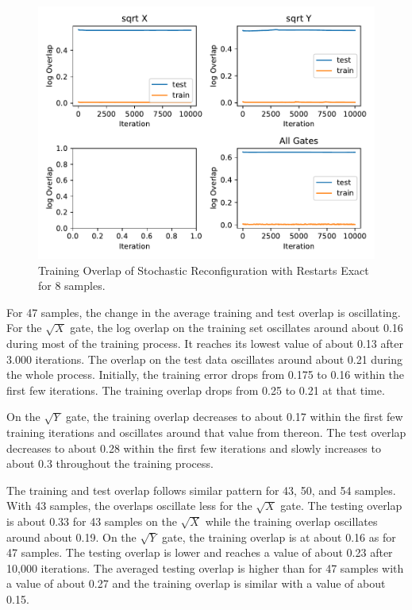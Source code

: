 \begin{figure}[H]
  \centering
  \includegraphics[width=\textwidth]{figures/results/SR-restarts-not-learned/avgOverlap_8.pdf}
  \caption[Training Overlap of Stochastic Reconfiguration with Restarts Exact]{Training 
  Overlap of Stochastic Reconfiguration with Restarts Exact for 8 samples.}
  \label{fig:sr_tvd}
\end{figure}

For 47 samples, the change in the average training and test overlap is oscillating. For the 
$\sqrt{X}$ gate, the log overlap on the training set oscillates around about 0.16 during most 
of the training process. It 
reaches its lowest value of about 0.13 after 3.000 iterations. The overlap on the test data 
oscillates around about 0.21 during the whole process. Initially, the training error drops from 
0.175 to 0.16 within the first few iterations. The training overlap drops from 0.25 to 0.21 at that time.

On the $\sqrt{Y}$ gate, the training overlap decreases to about 0.17 within the first few training iterations 
and oscillates around that value from thereon. The test overlap decreases to about 0.28 within the first few
iterations and slowly increases to about 0.3 throughout the training process.

The training and test overlap follows similar pattern for 43, 50, and 54 samples.
With 43 samples, the overlaps oscillate less for the $\sqrt{X}$ gate. The testing overlap is about 
0.33 for 43 samples on the $\sqrt{X}$ while the training overlap oscillates around about 0.19.
On the $\sqrt{Y}$ gate, the training overlap is at about 0.16 as for 47 samples. The testing overlap is 
lower and reaches a value of about 0.23 after 10,000 iterations. The averaged testing overlap is higher than 
for 47 samples with a value of about 0.27 and the training overlap is similar with a value of about 0.15.


